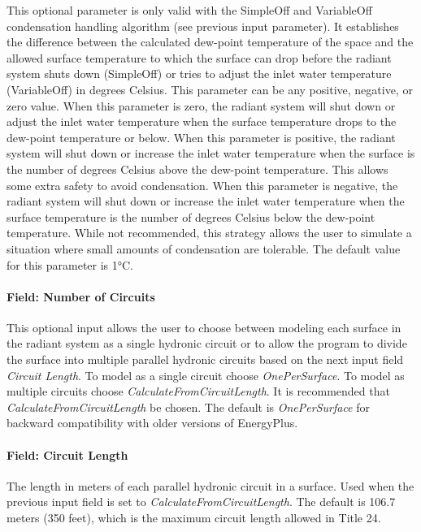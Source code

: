 This optional parameter is only valid with the SimpleOff and VariableOff condensation handling algorithm (see previous input parameter). It establishes the difference between the calculated dew-point temperature of the space and the allowed surface temperature to which the surface can drop before the radiant system shuts down (SimpleOff) or tries to adjust the inlet water temperature (VariableOff) in degrees Celsius. This parameter can be any positive, negative, or zero value. When this parameter is zero, the radiant system will shut down or adjust the inlet water temperature when the surface temperature drops to the dew-point temperature or below. When this parameter is positive, the radiant system will shut down or increase the inlet water temperature when the surface is the number of degrees Celsius above the dew-point temperature. This allows some extra safety to avoid condensation. When this parameter is negative, the radiant system will shut down or increase the inlet water temperature when the surface temperature is the number of degrees Celsius below the dew-point temperature. While not recommended, this strategy allows the user to simulate a situation where small amounts of condensation are tolerable. The default value for this parameter is 1°C.

\paragraph{Field: Number of Circuits}\label{field-number-of-circuits-1}

This optional input allows the user to choose between modeling each surface in the radiant system as a single hydronic circuit or to allow the program to divide the surface into multiple parallel hydronic circuits based on the next input field \emph{Circuit Length}. To model as a single circuit choose \emph{OnePerSurface}. To model as multiple circuits choose \emph{CalculateFromCircuitLength}. It is recommended that \emph{CalculateFromCircuitLength} be chosen. The default is \emph{OnePerSurface} for backward compatibility with older versions of EnergyPlus.

\paragraph{Field: Circuit Length}\label{field-circuit-length-1}

The length in meters of each parallel hydronic circuit in a surface. Used when the previous input field is set to \emph{CalculateFromCircuitLength}. The default is 106.7 meters (350 feet), which is the maximum circuit length allowed in Title 24.

